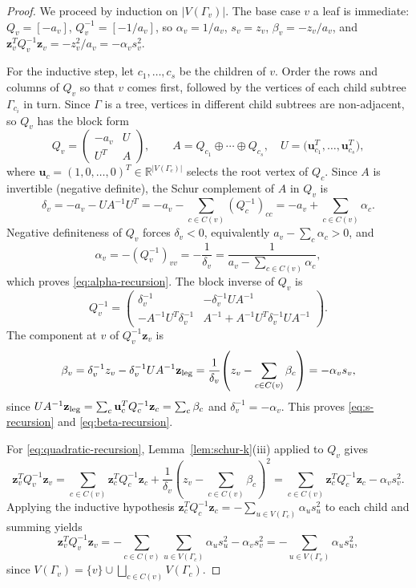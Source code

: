 \documentclass[11pt]{amsart}
\theoremstyle{plain}
\theoremstyle{definition}
\theoremstyle{remark}
\newcommand{\R}{\mathbb{R}}
\begin{document}
\begin{proof}
We proceed by induction on $|V(\Gamma_v)|$. The base case $v$ a leaf
is immediate: $Q_v=[-a_v]$, $Q_v^{-1}=[-1/a_v]$, so $\alpha_v=1/a_v$,
$s_v=z_v$, $\beta_v=-z_v/a_v$, and
$\mathbf{z}_v^TQ_v^{-1}\mathbf{z}_v=-z_v^2/a_v=-\alpha_v s_v^2$.

For the inductive step, let $c_1,\dots,c_s$ be the children of $v$.
Order the rows and columns of $Q_v$ so that $v$ comes first, followed
by the vertices of each child subtree $\Gamma_{c_i}$ in turn. Since
$\Gamma$ is a tree, vertices in different child subtrees are
non-adjacent, so $Q_v$ has the block form
\[
Q_v=\begin{pmatrix}-a_v & U \\ U^T & A\end{pmatrix},
\qquad
A=Q_{c_1}\oplus\cdots\oplus Q_{c_s},
\quad
U=\bigl(\mathbf{u}_{c_1}^T,\dots,\mathbf{u}_{c_s}^T\bigr),
\]
where $\mathbf{u}_c=(1,0,\dots,0)^T\in\R^{|V(\Gamma_c)|}$ selects
the root vertex of $Q_c$. Since $A$ is invertible (negative definite),
the Schur complement of $A$ in $Q_v$ is
\[
\delta_v
=-a_v-UA^{-1}U^T
=-a_v-\sum_{c\in C(v)}(Q_c^{-1})_{cc}
=-a_v+\sum_{c\in C(v)}\alpha_c.
\]
Negative definiteness of $Q_v$ forces $\delta_v<0$, equivalently
$a_v-\sum_c\alpha_c>0$, and
\[
\alpha_v=-(Q_v^{-1})_{vv}=-\frac{1}{\delta_v}
=\frac{1}{a_v-\sum_{c\in C(v)}\alpha_c},
\]
which proves \eqref{eq:alpha-recursion}. The block inverse of $Q_v$
is
\[
Q_v^{-1}=\begin{pmatrix}
\delta_v^{-1} & -\delta_v^{-1}UA^{-1}\\[1mm]
-A^{-1}U^T\delta_v^{-1} &
A^{-1}+A^{-1}U^T\delta_v^{-1}UA^{-1}
\end{pmatrix}.
\]
The component at $v$ of $Q_v^{-1}\mathbf{z}_v$ is
\[
\beta_v
=\delta_v^{-1}z_v-\delta_v^{-1}UA^{-1}\mathbf{z}_{\rm leg}
=\frac{1}{\delta_v}\!\left(z_v-\sum_{c\in C(v)}\beta_c\right)
=-\alpha_v s_v,
\]
since $UA^{-1}\mathbf{z}_{\rm leg}
=\sum_c\mathbf{u}_c^TQ_c^{-1}\mathbf{z}_c=\sum_c\beta_c$ and
$\delta_v^{-1}=-\alpha_v$. This proves \eqref{eq:s-recursion} and
\eqref{eq:beta-recursion}.

For \eqref{eq:quadratic-recursion}, Lemma~\ref{lem:schur-k}(iii)
applied to $Q_v$ gives
\[
\mathbf{z}_v^TQ_v^{-1}\mathbf{z}_v
=\sum_{c\in C(v)}\mathbf{z}_c^TQ_c^{-1}\mathbf{z}_c
+\frac{1}{\delta_v}\!\left(z_v-\sum_{c\in C(v)}\beta_c\right)^{\!2}
=\sum_{c\in C(v)}\mathbf{z}_c^TQ_c^{-1}\mathbf{z}_c
-\alpha_v s_v^2.
\]
Applying the inductive hypothesis
$\mathbf{z}_c^TQ_c^{-1}\mathbf{z}_c=-\sum_{u\in V(\Gamma_c)}\alpha_u s_u^2$
to each child and summing yields
\[
\mathbf{z}_v^TQ_v^{-1}\mathbf{z}_v
=-\sum_{c\in C(v)}\sum_{u\in V(\Gamma_c)}\alpha_u s_u^2
-\alpha_v s_v^2
=-\sum_{u\in V(\Gamma_v)}\alpha_u s_u^2,
\]
since $V(\Gamma_v)=\{v\}\cup\bigsqcup_{c\in C(v)}V(\Gamma_c)$.
\end{proof}
\end{document}
